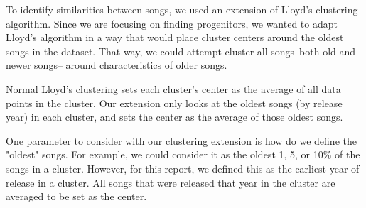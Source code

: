 To identify similarities between songs, we used an extension of Lloyd's clustering algorithm.
Since we are focusing on finding progenitors, we wanted to adapt Lloyd's algorithm
in a way that would place cluster centers around the oldest songs in the dataset.
That way, we could attempt cluster all songs--both old and newer songs--
around characteristics of older songs.

Normal Lloyd's clustering sets each cluster's center as the average of all data points in the cluster.
Our extension only looks at the oldest songs (by release year) in each cluster,
and sets the center as the average of those oldest songs.

One parameter to consider with our clustering extension is how do we define the "oldest" songs.
For example, we could consider it as the oldest 1, 5, or 10\% of the songs in a cluster.
However, for this report, we defined this as the earliest year of release in a cluster.
All songs that were released that year in the cluster are averaged to be set as the center.
